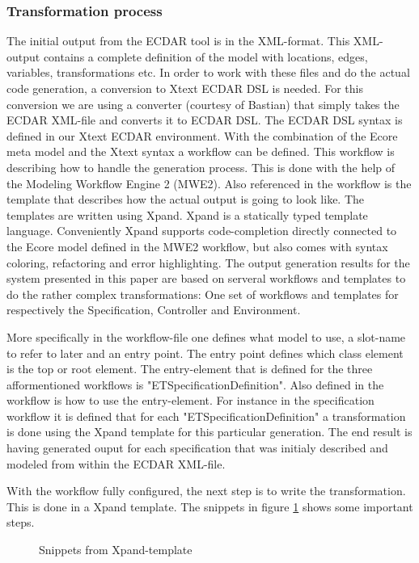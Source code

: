 \subsubsection{Transformation process \label{transformation-process}}
The initial output from the ECDAR tool is in the XML-format. This XML-output contains a complete definition of the model with locations, edges, variables, transformations etc. In order to work with these files and do the actual code generation, a conversion to Xtext ECDAR DSL is needed. For this conversion we are using a converter (courtesy of Bastian) that simply takes the ECDAR XML-file and converts it to ECDAR DSL. The ECDAR DSL syntax is defined in our Xtext ECDAR environment. With the combination of the Ecore meta model and the Xtext syntax a workflow can be defined. This workflow is describing how to handle the generation process. This is done with the help of the Modeling Workflow Engine 2 (MWE2). Also referenced in the workflow is the template that describes how the actual output is going to look like. The templates are written using Xpand. Xpand is a statically typed template language. Conveniently Xpand supports code-completion directly connected to the Ecore model defined in the MWE2 workflow, but also comes with syntax coloring, refactoring and error highlighting. The output generation results for the system presented in this paper are based on serveral workflows and templates to do the rather complex transformations: One set of workflows and templates for respectively the Specification, Controller and Environment.

More specifically in the workflow-file one defines what model to use, a slot-name to refer to later and an entry point. The entry point defines which class element is the top or root element. The entry-element that is defined for the three afformentioned workflows is "ETSpecificationDefinition". Also defined in the workflow is how to use the entry-element. For instance in the specification workflow it is defined that for each "ETSpecificationDefinition" a transformation is done using the Xpand template for this particular generation. The end result is having generated ouput for each specification that was initialy described and modeled from within the ECDAR XML-file.

With the workflow fully configured, the next step is to write the transformation. This is done in a Xpand template. The snippets in figure \ref{xpand-example} shows some important steps.

\begin{figure}[t]



\caption{Snippets from Xpand-template \label{xpand-example}}
\end{figure}

